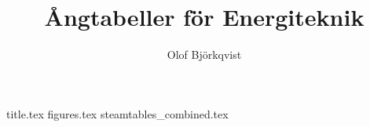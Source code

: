 \documentclass[a4paper]{article}
\author{Olof Björkqvist}
\title{Ångtabeller för Energiteknik}
\begin{document}
{title.tex}
{figures.tex}
{steamtables_combined.tex}
\end{document}
